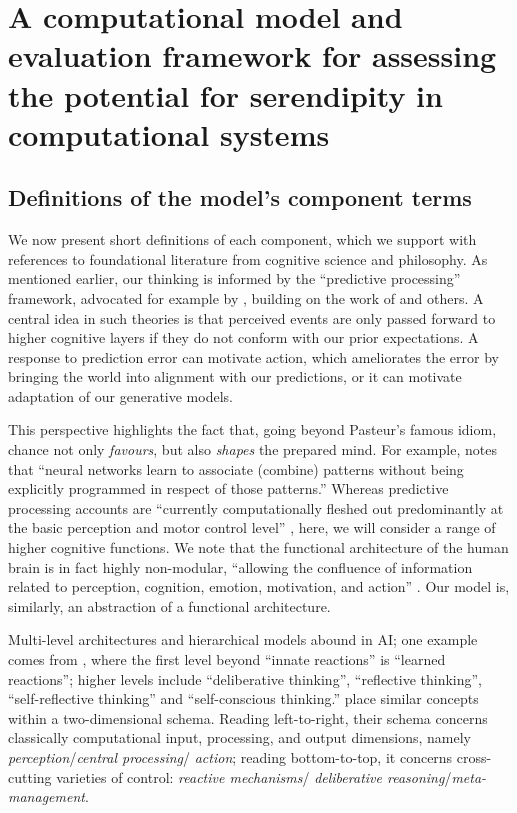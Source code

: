 \section{A computational model and evaluation framework for assessing the potential for serendipity in computational systems} \label{sec:our-model}

\subsection{Definitions of the model's component terms} \label{sec:modelTerms}

We now present short definitions of each component, which we support
with references to foundational literature from cognitive science and
philosophy.  As mentioned earlier, our thinking is informed by the
``predictive processing'' framework, advocated for example by
\citet{clark2013whatever}, building on the work of
\citet{friston2009free} and others.  A central idea in such theories
is that perceived events are only passed forward to higher cognitive
layers if they do not conform with our prior expectations.  A response
to prediction error can motivate action, which ameliorates the error
by bringing the world into alignment with our predictions, or it can
motivate adaptation of our generative models.

This perspective highlights the fact that, going beyond Pasteur's
famous idiom, chance not only \emph{favours}, but also \emph{shapes}
the prepared mind.  For example, \citet[p.~137]{boden} notes that
``neural networks learn to associate (combine) patterns without being
explicitly programmed in respect of those patterns.''  Whereas
predictive processing accounts are ``currently computationally fleshed
out predominantly at the basic perception and motor control level''
\cite{KWISTHOUT201784}, here, we will consider a range of higher
cognitive functions.  We note that the functional architecture of the
human brain is in fact highly non-modular, ``allowing the confluence
of information related to perception, cognition, emotion, motivation,
and action'' \cite[p.~357]{Pessoa2017}.  Our model is, similarly, an
abstraction of a functional architecture.

Multi-level architectures and hierarchical models abound in AI; one
example comes from \citet{singh2005architecture}, where the first
level beyond ``innate reactions'' is ``learned reactions''; higher
levels include ``deliberative thinking'', ``reflective thinking'',
``self-reflective thinking'' and ``self-conscious thinking.''
\citet{sloman2002framework} place similar concepts within a
two-dimensional schema.  Reading left-to-right, their schema concerns
classically computational input, processing, and output dimensions,
namely \emph{perception}\slash \emph{central processing}\slash
\emph{action}; reading bottom-to-top, it concerns cross-cutting
varieties of control: \emph{reactive mechanisms}\slash
\emph{deliberative reasoning}\slash \emph{meta-management}.


